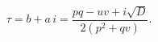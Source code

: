 \begin{equation} \label{T6mod}
 \tau = b + a \, i = \frac{pq-uv + i \sqrt{D}}{2(p^2+q v)}.
\end{equation}

